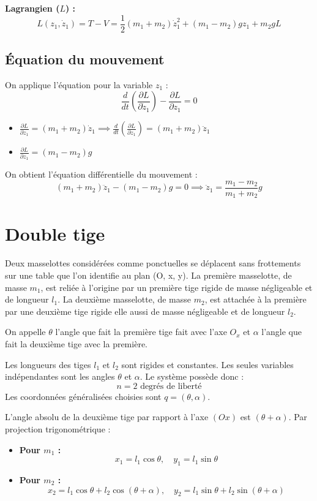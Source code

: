 \documentclass[french]{yLectureNote}
\begin{document}
\textbf{Lagrangien ($L$) :}
$$L(z_1, \dot{z}_1) = T - V = \frac{1}{2}(m_1 + m_2)\dot{z}_1^2 + (m_1 - m_2)gz_1 + m_2gL$$
\subsection{Équation du mouvement}

On applique l'équation pour la variable $z_1$ :
$$\frac{d}{dt}\left(\frac{\partial L}{\partial \dot{z}_1}\right) - \frac{\partial L}{\partial z_1} = 0$$
\begin{itemize}
    \item $\frac{\partial L}{\partial \dot{z}_1} = (m_1 + m_2)\dot{z}_1 \implies \frac{d}{dt}\left(\frac{\partial L}{\partial \dot{z}_1}\right) = (m_1 + m_2)\ddot{z}_1$
    \item $\frac{\partial L}{\partial z_1} = (m_1 - m_2)g$
\end{itemize}
On obtient l'équation différentielle du mouvement :
$$(m_1 + m_2)\ddot{z}_1 - (m_1 - m_2)g = 0 \implies \ddot{z}_1 = \frac{m_1 - m_2}{m_1 + m_2}g$$
\section{Double tige}
Deux masselottes considérées comme ponctuelles se déplacent sans frottements sur une table que l’on identifie au plan (O, x, y). La première masselotte,
de masse $m_1$, est reliée à l’origine par un première tige rigide de masse négligeable
et de longueur $l_1$. La deuxième masselotte, de masse $m_2$, est attachée à la première par une deuxième tige rigide elle aussi de masse négligeable et de longueur
$l_2$.

On appelle $\theta$ l’angle que fait la première tige fait avec l’axe $O_x$ et $\alpha$ l’angle
que fait la deuxième tige avec la première.

Les longueurs des tiges $l_1$ et $l_2$ sont rigides et constantes. Les seules variables indépendantes sont les angles $\theta$ et $\alpha$. Le système possède donc :
$$n = 2 \text{ degrés de liberté}$$
Les coordonnées généralisées choisies sont $q = (\theta, \alpha)$.


L'angle absolu de la deuxième tige par rapport à l'axe $(Ox)$ est $(\theta + \alpha)$. Par projection trigonométrique :
\begin{itemize}
    \item \textbf{Pour $m_1$ :}
    $$x_1 = l_1\cos\theta, \quad y_1 = l_1\sin\theta$$
    \item \textbf{Pour $m_2$ :}
    $$x_2 = l_1\cos\theta + l_2\cos(\theta+\alpha), \quad y_2 = l_1\sin\theta + l_2\sin(\theta+\alpha)$$
\end{itemize}
\end{document}
